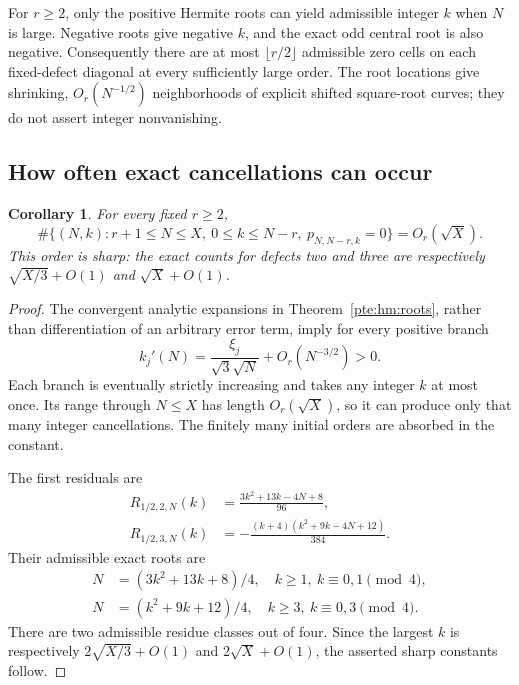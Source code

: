 \documentclass[11pt,a4paper]{article}
\numberwithin{equation}{section}
\newtheorem{corollary}[theorem]{Corollary}
\theoremstyle{definition}
\theoremstyle{plain}
\begin{document}
For $r\ge2$, only the positive Hermite roots can yield admissible integer $k$ when $N$ is large. Negative roots give negative $k$, and the exact odd central root is also negative. Consequently there are at most $\lfloor r/2\rfloor$ admissible zero cells on each fixed-defect diagonal at every sufficiently large order. The root locations give shrinking, $O_r(N^{-1/2})$ neighborhoods of explicit shifted square-root curves; they do not assert integer nonvanishing.

\subsection{How often exact cancellations can occur}
\begin{corollary}\label{pte:hm:frequency}
For every fixed $r\ge2$,
\begin{equation}\label{pte:hm:count}
 \#\{(N,k):r+1\le N\le X,\ 0\le k\le N-r,\ p_{N,N-r,k}=0\}
 =O_r(\sqrt X).
\end{equation}
This order is sharp: the exact counts for defects two and three are respectively $\sqrt{X/3}+O(1)$ and $\sqrt X+O(1)$.
\end{corollary}
\begin{proof}
The convergent analytic expansions in Theorem~\ref{pte:hm:roots}, rather than differentiation of an arbitrary error term, imply for every positive branch
\[
 k_j'(N)=\frac{\xi_j}{\sqrt3\sqrt N}+O_r(N^{-3/2})>0.
\]
Each branch is eventually strictly increasing and takes any integer $k$ at most once. Its range through $N\le X$ has length $O_r(\sqrt X)$, so it can produce only that many integer cancellations. The finitely many initial orders are absorbed in the constant.

The first residuals are
\begin{align}
 R_{1/2,2,N}(k)&=\frac{3k^2+13k-4N+8}{96},\label{pte:hm:Rtwo}\\
 R_{1/2,3,N}(k)&=-\frac{(k+4)(k^2+9k-4N+12)}{384}.\label{pte:hm:Rthree}
\end{align}
Their admissible exact roots are
\begin{align*}
 N&=(3k^2+13k+8)/4,\quad k\ge1,\ k\equiv0,1\pmod4,\\
 N&=(k^2+9k+12)/4,\quad k\ge3,\ k\equiv0,3\pmod4.
\end{align*}
There are two admissible residue classes out of four. Since the largest $k$ is respectively $2\sqrt{X/3}+O(1)$ and $2\sqrt X+O(1)$, the asserted sharp constants follow.
\end{proof}
\end{document}
